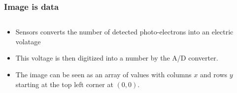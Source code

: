 \documentclass[ignorenonframetext,aspectratio=169,10pt,xcolor=table]{beamer}
\begin{document}
\begin{frame} \frametitle{Image is data}

  \begin{columns}
    \begin{column}{.5\textwidth}
      \begin{itemize}
      \item Sensors converts the number of detected photo-electrons
        into an electric volatage
      \item This voltage is then digitized into a number by the A/D
        converter.
      \item The image can be seen as an array of values with columns
        $x$ and rows $y$ starting at the top left corner at $(0,0)$.
      \end{itemize}
      \end{column}
    \begin{column}{.5\textwidth}
    \end{column}
  \end{columns}
\end{frame}
\end{document}

